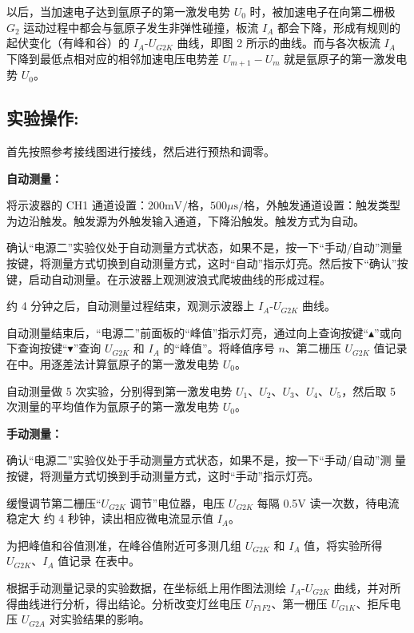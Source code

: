 \documentclass[10pt,a4paper]{ctexart}
\begin{document}
以后，当加速电子达到氩原子的第一激发电势 $U_0$ 时，被加速电子在向第二栅极 $G_2$ 运动过程中都会与氩原子发生非弹性碰撞，板流 $I_A$ 都会下降，形成有规则的起伏变化（有峰和谷）的 $I_A \text{-} U_{G2K}$ 曲线，即图 2 所示的曲线。而与各次板流 $I_A$ 下降到最低点相对应的相邻加速电压电势差 $U_{m+1}-U_m$ 就是氩原子的第一激发电势 $U_0$。
      
    
    \subsection*{实验操作:}

    首先按照参考接线图进行接线，然后进行预热和调零。
    
    \textbf{自动测量：}

将示波器的 CH1 通道设置：$200\text{mV}/\text{格}$，$500\mu\text{s}/\text{格}$，外触发通道设置：触发类型为边沿触发。触发源为外触发输入通道，下降沿触发。触发方式为自动。
    
确认“电源二”实验仪处于自动测量方式状态，如果不是，按一下“手动/自动”测量按键，将测量方式切换到自动测量方式，这时“自动”指示灯亮。然后按下“确认”按键，启动自动测量。在示波器上观测波浪式爬坡曲线的形成过程。
    
约 4 分钟之后，自动测量过程结束，观测示波器上 $I_A \text{-} U_{G2K}$ 曲线。
    
    自动测量结束后，“电源二”前面板的“峰值”指示灯亮，通过向上查询按键“$\blacktriangle$”或向下查询按键“$\blacktriangledown$”查询 $U_{G2K}$ 和 $I_A$ 的“峰值”。将峰值序号 $n$、第二栅压 $U_{G2K}$ 值记录在中。用逐差法计算氩原子的第一激发电势 $U_0$。
    
    自动测量做 5 次实验，分别得到第一激发电势 $U_1$、$U_2$、$U_3$、$U_4$、$U_5$，然后取 5 次测量的平均值作为氩原子的第一激发电势 $U_0$。

    \textbf{手动测量：}

    确认“电源二”实验仪处于手动测量方式状态，如果不是，按一下“手动/自动”测
量按键，将测量方式切换到手动测量方式，这时“手动”指示灯亮。

缓慢调节第二栅压“$U_{G2K}$ 调节”电位器，电压 $U_{G2K}$ 每隔 0.5V 读一次数，待电流稳定大
约 4 秒钟，读出相应微电流显示值 $I_A$。

为把峰值和谷值测准，在峰谷值附近可多测几组 $U_{G2K}$ 和 $I_A$ 值，将实验所得 $U_{G2K}$、$I_A$ 值记录
在表中。

根据手动测量记录的实验数据，在坐标纸上用作图法测绘 $I_A \text{-} U_{G2K}$ 曲线，并对所得曲线进行分析，得出结论。分析改变灯丝电压 $U_{F1F2}$、第一栅压 $U_{G1K}$、拒斥电压 $U_{G2A}$ 对实验结果的影响。
\end{document}
